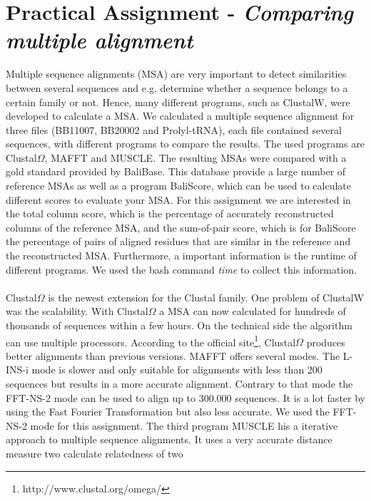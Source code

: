 \documentclass[%
   10pt,              %
   nenglish,           %
   a4paper,           %
   DIV11,             %
]{scrartcl}%
\begin{document}
\section*{Practical Assignment - \textsl{Comparing multiple alignment}}
Multiple sequence alignments (MSA) are very important to detect similarities between several 
sequences and e.g. determine whether a sequence belongs to a certain family or not. Hence, many 
different programs, such as ClustalW, were developed to calculate a MSA. We calculated a multiple 
sequence alignment for three files (BB11007, BB20002 and Prolyl-tRNA), each file contained several 
sequences, with different programs 
to compare the results. The used programs are Clustal$\Omega$\cite{Sievers539}, MAFFT\cite{Katoh1} 
and MUSCLE\cite{Edgar1, Edgar2}. The resulting MSAs were compared with a gold standard provided by 
BaliBase\cite{Bahr1}. This database provide a large number of reference MSAs as well as a program 
\grqq BaliScore\grqq , which can be used to calculate different scores to evaluate your MSA. For 
this assignment we are interested in the total column score, which is the percentage of accurately 
reconstructed columns of the reference MSA, and the sum-of-pair score, which is for BaliScore the 
percentage of pairs of aligned residues that are similar in the reference and the reconstructed 
MSA. Furthermore, a important information is the runtime of different programs. We used the bash 
command \textit{time} to collect this information.\\
\\
\noindent Clustal$\Omega$ \cite{Sievers539} is the newest extension for the Clustal family. One problem of ClustalW 
was the scalability. With Clustal$\Omega$ a MSA can now calculated for hundreds of thousands of 
sequences within a few hours. On the technical side the algorithm can use multiple processors. 
According to the official site\footnote{http://www.clustal.org/omega/}, Clustal$\Omega$ produces 
better alignments than previous versions. MAFFT\cite{Katoh1} offers several modes. The L-INS-i mode is 
slower and only suitable for alignments with less than 200 sequences but results in a more accurate 
alignment. Contrary to that mode the FFT-NS-2 mode can be used to align up to 300.000 sequences. It 
is a lot faster by using the Fast Fourier Transformation but also less accurate. We used the 
FFT-NS-2 mode for this assignment. The third program MUSCLE \cite{Edgar1} his a iterative approach to multiple 
sequence alignments. It uses a very accurate distance measure two calculate relatedness of two 
\end{document}
